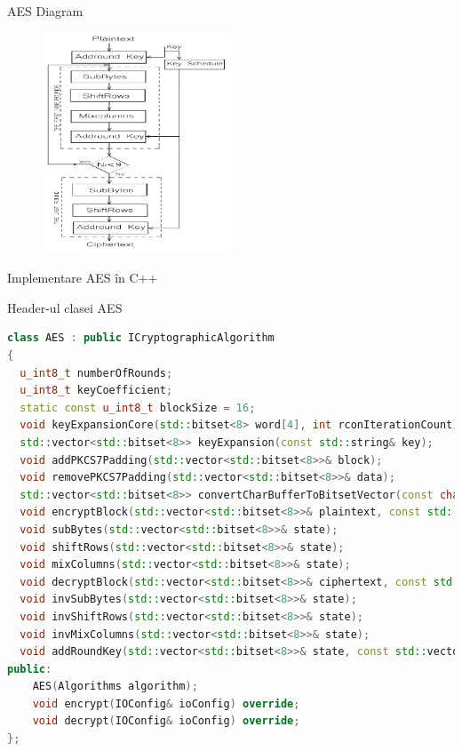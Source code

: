 \documentclass{beamer}
\begin{document}
\begin{frame}{AES Diagram}
  \begin{figure}
    \centering
    \includegraphics[width=0.5\textwidth]{images/aes_diagram.png}
  \end{figure}
\end{frame}

\begin{frame}[fragile]{Implementare AES în C++}
  \begin{block}{Header-ul clasei AES}
    \begin{lstlisting}[language=C++]
class AES : public ICryptographicAlgorithm
{
  u_int8_t numberOfRounds;
  u_int8_t keyCoefficient;
  static const u_int8_t blockSize = 16;
  void keyExpansionCore(std::bitset<8> word[4], int rconIterationCount);
  std::vector<std::bitset<8>> keyExpansion(const std::string& key);
  void addPKCS7Padding(std::vector<std::bitset<8>>& block);
  void removePKCS7Padding(std::vector<std::bitset<8>>& data);
  std::vector<std::bitset<8>> convertCharBufferToBitsetVector(const char* buffer, size_t length);
  void encryptBlock(std::vector<std::bitset<8>>& plaintext, const std::vector<std::bitset<8>>& expandedKeys);
  void subBytes(std::vector<std::bitset<8>>& state);
  void shiftRows(std::vector<std::bitset<8>>& state);
  void mixColumns(std::vector<std::bitset<8>>& state);
  void decryptBlock(std::vector<std::bitset<8>>& ciphertext, const std::vector<std::bitset<8>>& expandedKeys);
  void invSubBytes(std::vector<std::bitset<8>>& state);
  void invShiftRows(std::vector<std::bitset<8>>& state);
  void invMixColumns(std::vector<std::bitset<8>>& state);
  void addRoundKey(std::vector<std::bitset<8>>& state, const std::vector<std::bitset<8>>& roundKey);
public:
    AES(Algorithms algorithm);
    void encrypt(IOConfig& ioConfig) override;
    void decrypt(IOConfig& ioConfig) override;
};
    \end{lstlisting}
  \end{block}
\end{frame}
\end{document}
